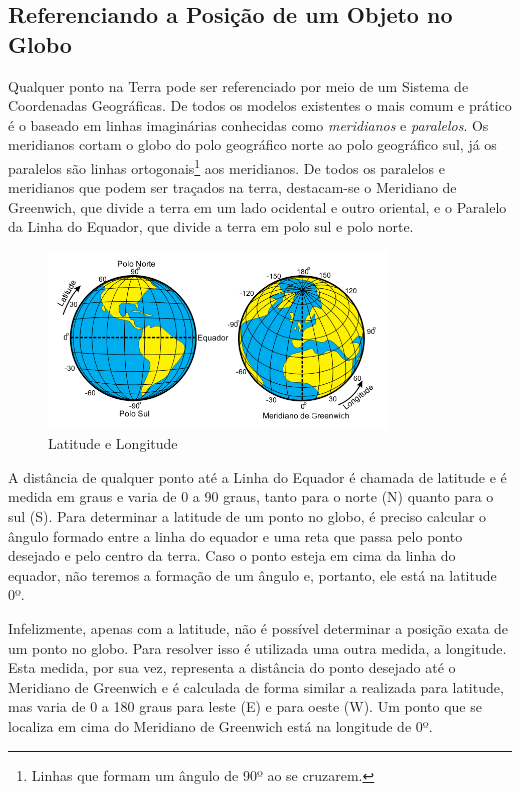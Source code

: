 \subsection{Referenciando a Posição de um Objeto no Globo}

Qualquer ponto na Terra pode ser referenciado por meio de um Sistema de Coordenadas Geográficas. De todos os modelos existentes o mais comum e prático é o baseado em linhas imaginárias conhecidas como \emph{meridianos} e \emph{paralelos}. Os meridianos cortam o globo do polo geográfico norte ao polo geográfico sul, já os paralelos são linhas ortogonais\footnote{Linhas que formam um ângulo de 90º ao se cruzarem.} aos meridianos. De todos os paralelos e meridianos que podem ser traçados na terra, destacam-se o Meridiano de Greenwich, que divide a terra em um lado ocidental e outro oriental, e o Paralelo da Linha do Equador, que divide a terra em polo sul e polo norte. \cite{fitz2008geoprocessamento}

\begin{figure}[htp!]
\centering
\includegraphics[width=0.80\textwidth]{figuras/cap_2/secao_3/latitude_longitude.png}
\caption{Latitude e Longitude}
\label{latitudeLingitude}
\end{figure}

A distância de qualquer ponto até a Linha do Equador é chamada de latitude e é medida em graus e varia de 0 a 90 graus, tanto para o norte (N) quanto para o sul (S). Para determinar a latitude de um ponto no globo, é preciso calcular o ângulo formado entre a linha do equador e uma reta que passa pelo ponto desejado e pelo centro da terra. Caso o ponto esteja em cima da linha do equador, não teremos a formação de um ângulo e, portanto, ele está na latitude 0º. \cite{fitz2008geoprocessamento}

Infelizmente, apenas com a latitude, não é possível determinar a posição exata de um ponto no globo. Para resolver isso é utilizada uma outra medida, a longitude. Esta medida, por sua vez, representa a distância do ponto desejado até o Meridiano de Greenwich e é calculada de forma similar a realizada para latitude, mas varia de 0 a 180 graus para leste (E) e para oeste (W). Um ponto que se localiza em cima do Meridiano de Greenwich está na longitude de 0º. \cite{fitz2008geoprocessamento}

